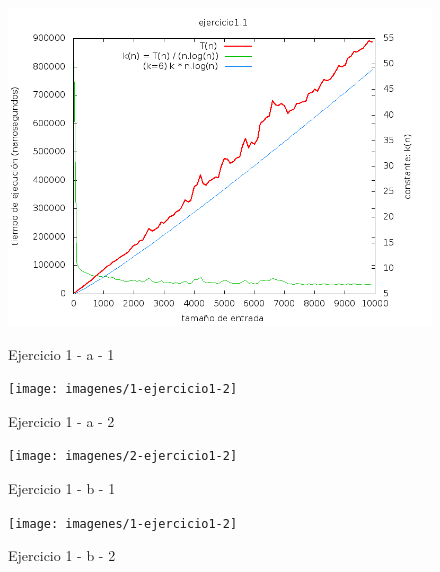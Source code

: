 \documentclass[11pt,a4paper]{article}
\begin{document}
    	\begin{center}
          \begin{figure}[H]
                \caption{Ejercicio 1 - a - 1}
        	\includegraphics[scale=0.50]{imagenes/1-ejercicio1-1}
                \label{ej111}
          \end{figure}
    	\end{center}

    	\begin{center}
          \begin{figure}[H]
                \caption{Ejercicio 1 - a - 2}
        	\texttt{[image: imagenes/1-ejercicio1-2]}
                \label{ej112}
          \end{figure}
    	\end{center}

    	\begin{center}
          \begin{figure}[H]
                \caption{Ejercicio 1 - b - 1}
        	\texttt{[image: imagenes/2-ejercicio1-2]}
                \label{ej121}
          \end{figure}
    	\end{center}

    	\begin{center}
          \begin{figure}[H]
                \caption{Ejercicio 1 - b - 2}
        	\texttt{[image: imagenes/1-ejercicio1-2]}
                \label{ej122}
          \end{figure}
    	\end{center}
\end{document}
